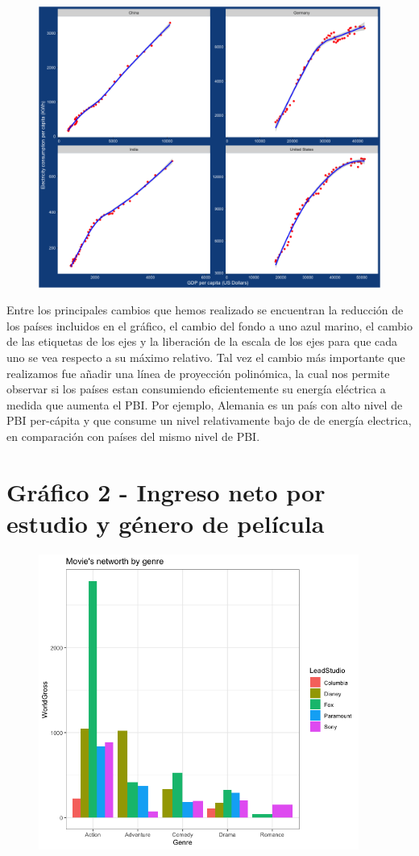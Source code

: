 \documentclass[11pt,a4paper]{article}
\begin{document}
\begin{figure}[!h]
    \centering
    \includegraphics[width=12cm]{new/graph1.png}
\end{figure}

Entre los principales cambios que hemos realizado se encuentran la reducción de los países incluidos en el gráfico, el cambio del fondo a uno azul marino, el cambio de las etiquetas de los ejes y la liberación de la escala de los ejes para que cada uno se vea respecto a su máximo relativo. Tal vez el cambio más importante que realizamos fue añadir una línea de proyección polinómica, la cual nos permite observar si los países estan consumiendo eficientemente su energía eléctrica a medida que aumenta el PBI. Por ejemplo, Alemania es un país con alto nivel de PBI per-cápita y que consume un nivel relativamente bajo de de energía electrica, en comparación con países del mismo nivel de PBI.

\clearpage
\section{Gráfico 2 - Ingreso neto por estudio y género de película}

\begin{figure}[!h]
    \centering
    \includegraphics[width=10.5cm]{old/graph2.png}
\end{figure}
\end{document}
